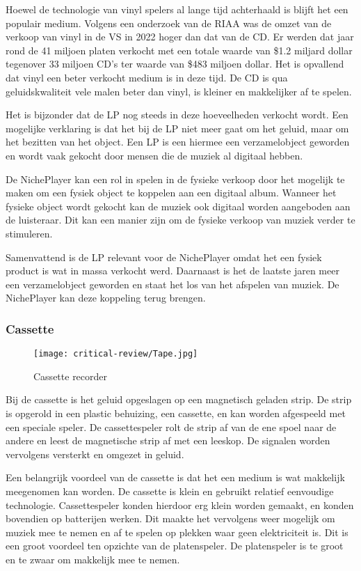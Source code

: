 Hoewel de technologie van vinyl spelers al lange tijd achterhaald is blijft het een populair medium. Volgens een onderzoek van de RIAA \cite{year_end_2022_RIAA_revenue_statistics} was de omzet van de verkoop van vinyl in de VS in 2022 hoger dan dat van de CD. Er werden dat jaar rond de 41 miljoen platen verkocht met een totale waarde van \$1.2 miljard dollar tegenover 33 miljoen CD's ter waarde van \$483 miljoen dollar. Het is opvallend dat vinyl een beter verkocht medium is in deze tijd. De CD is qua geluidskwaliteit vele malen beter dan vinyl, is kleiner en makkelijker af te spelen.

Het is bijzonder dat de LP nog steeds in deze hoeveelheden verkocht wordt. Een mogelijke verklaring is dat het bij de LP niet meer gaat om het geluid, maar om het bezitten van het object. Een LP is een hiermee een verzamelobject geworden en wordt vaak gekocht door mensen die de muziek al digitaal hebben.

De NichePlayer kan een rol in spelen in de fysieke verkoop door het mogelijk te maken om een fysiek object te koppelen aan een digitaal album. Wanneer het fysieke object wordt gekocht kan de muziek ook digitaal worden aangeboden aan de luisteraar. Dit kan een manier zijn om de fysieke verkoop van muziek verder te stimuleren.

Samenvattend is de LP relevant voor de NichePlayer omdat het een fysiek product is wat in massa verkocht werd. Daarnaast is het de laatste jaren meer een verzamelobject geworden en staat het los van het afspelen van muziek. De NichePlayer kan deze koppeling terug brengen.

\subsubsection*{Cassette}
\begin{wrapfigure}{r}{0.25\textwidth}
    \centering
    \texttt{[image: critical-review/Tape.jpg]}
    \caption{Cassette recorder}
    \label{fig:critical-review:tape}
\end{wrapfigure}
Bij de cassette is het geluid opgeslagen op een magnetisch geladen strip. De strip is opgerold in een plastic behuizing, een cassette, en kan worden afgespeeld met een speciale speler. De cassettespeler rolt de strip af van de ene spoel naar de andere en leest de magnetische strip af met een leeskop. De signalen worden vervolgens versterkt en omgezet in geluid.

Een belangrijk voordeel van de cassette is dat het een medium is wat makkelijk meegenomen kan worden. De cassette is klein en gebruikt relatief eenvoudige technologie. Cassettespeler konden hierdoor erg klein worden gemaakt, en konden bovendien op batterijen werken. Dit maakte het vervolgens weer mogelijk om muziek mee te nemen en af te spelen op plekken waar geen elektriciteit is. Dit is een groot voordeel ten opzichte van de platenspeler. De platenspeler is te groot en te zwaar om makkelijk mee te nemen.

